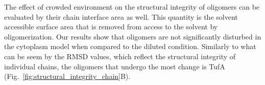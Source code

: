 \documentclass[journal=jcisd8,manuscript=article]{achemso}
\begin{document}

The effect of crowded environment on the structural integrity of
oligomers can be evaluated by their chain interface area as well. This
quantity is the solvent accessible surface area that is removed from
access to the solvent by oligomerization. Our results show that
oligomers are not significantly disturbed in the cytoplasm model when
compared to the diluted condition. Similarly to what can be seem by
the RMSD values, which reflect the structural integrity of individual
chains, the oligomers that undergo the most change is TufA
(Fig.~\ref{fig:structural_integrity_chain}B).
\end{document}

